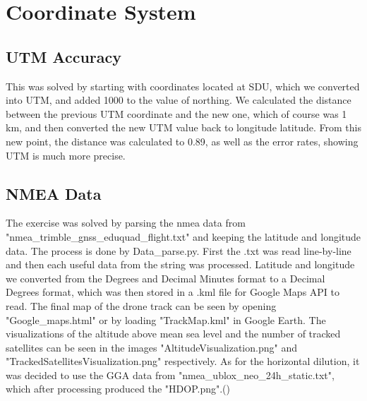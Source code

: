 \documentclass[paper=letter, fontsize=10pt]{article}
\begin{document}
\section{Coordinate System}
\subsection{UTM Accuracy}
This was solved by starting with coordinates located at SDU, which we converted into UTM, and added 1000 to the value of northing. We calculated the distance between the previous UTM coordinate and the new one, which of course was 1 km, and then converted the new UTM value back to longitude latitude. From this new point, the distance was calculated to 0.89, as well as the error rates, showing UTM is much more precise. 

\subsection{NMEA Data}
The exercise was solved by parsing the nmea data from "nmea\_trimble\_gnss\_eduquad\_flight.txt" and keeping the latitude and longitude data. The process is done by Data\_parse.py. First the .txt was read line-by-line and then each useful data from the string was processed. Latitude and longitude we converted from the Degrees and Decimal Minutes format to a Decimal Degrees format, which was then stored in a .kml file for Google Maps API to read. The final map of the drone track can be seen by opening "Google\_maps.html" or by loading "TrackMap.kml" in Google Earth. The visualizations of the altitude above mean sea level and the number of tracked satellites can be seen in the images "AltitudeVisualization.png" and "TrackedSatellitesVisualization.png" respectively. As for the horizontal dilution, it was decided to use the GGA data from "nmea\_ublox\_neo\_24h\_static.txt", which after processing produced the "HDOP.png".(\cite{git})





\end{document}

